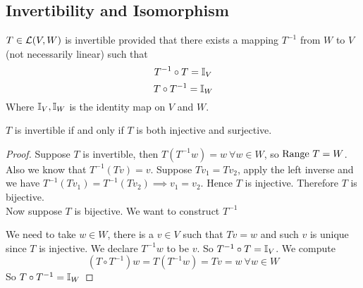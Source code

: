 \subsection{Invertibility and Isomorphism}
\begin{center}
\end{center}
\begin{definition}
    $T \in \mathcal L(V,W)$ is invertible provided that there exists a mapping $T^{-1}$ from $W$ to $V$ (not necessarily linear) such that \[ T^{-1} \circ T = \mathbb I_V\]
    \[ T \circ T^{-1} = \mathbb I_W\]
    Where $\mathbb I_{V}, \mathbb I_W$ is the identity map on $V$ and $W$.
\end{definition}
\begin{theorem}
    $T$ is invertible if and only if $T$ is both injective and surjective.
\end{theorem}
\begin{proof}
    Suppose $T$ is invertible, then $T(T^{-1} w) = w \ \forall w \in W$, so $\text{Range } T = W$. Also we know that $T^{-1}(T v) = v$. Suppose $Tv_1 =Tv_2$, apply the left inverse and we have $T^{-1} (Tv_1) = T^{-1} (Tv_2) \implies v_1 = v_2$. Hence $T$ is injective. Therefore $T$ is bijective. \\
    Now suppose $T$ is bijective. We want to construct $T^{-1}$
    \begin{center}
\end{center}
We need to take $w \in W$, there is a $v \in V$ such that $Tv = w$ and such $v$ is unique since $T$ is injective. We declare $T^{-1}w$ to be $v$. So $T^{-1} \circ T = \mathbb I_{V}$. We compute \[ (T \circ T^{-1}) w = T(T^{-1} w) = Tv = w \ \forall  w \in W\] So $T \circ T^{-1} = \mathbb I_W$ 
\end{proof}
